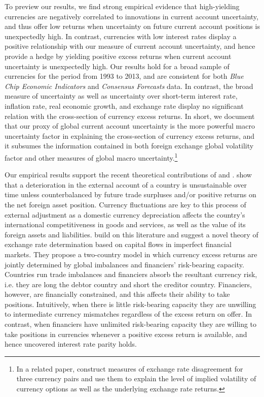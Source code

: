 To preview our results, we find strong empirical evidence that high-yielding currencies are negatively correlated to innovations in current account uncertainty, and thus offer low returns when uncertainty on future current account positions is unexpectedly high. In contrast, currencies with low interest rates display a positive relationship with our measure of current account uncertainty, and hence provide a hedge by yielding positive excess returns when current account uncertainty is unexpectedly high. Our results hold for a broad sample of currencies for the period from 1993 to 2013, and are consistent for both \emph{Blue Chip Economic Indicators} and \emph{Consensus Forecasts} data. In contrast, the broad measure of uncertainty as well as uncertainty over short-term interest rate, inflation rate, real economic growth, and exchange rate display no significant relation with the cross-section of currency excess returns. In short, we document that our proxy of global current account uncertainty is the more powerful macro uncertainty factor in explaining the cross-section of currency excess returns, and it subsumes the information contained in both foreign exchange global volatility factor and other measures of global macro uncertainty.\footnote{In a related paper, \citet{beber_etal2010} construct measures of exchange rate disagreement for three currency pairs and use them to explain the level of implied volatility of currency options as well as the underlying exchange rate returns.}

Our empirical results support the recent theoretical contributions of \citet{gourinchas_rey2007} and \citet{gabaix_maggiori2015}. \citet{gourinchas_rey2007} show that a deterioration in the external account of a country is unsustainable over time unless counterbalanced by future trade surpluses and/or positive returns on the net foreign asset position.  Currency fluctuations are key to this process of external adjustment as a domestic currency depreciation affects the country's international competitiveness in goods and services, as well as the value of its foreign assets and liabilities. \citet{gabaix_maggiori2015} build on this literature and suggest a novel theory of exchange rate determination based on capital flows in imperfect financial markets. They propose a two-country model in which currency excess returns are jointly determined by global imbalances and financiers' risk-bearing capacity. Countries run trade imbalances and financiers absorb the resultant currency risk, i.e. they are long the debtor country and short the creditor country. Financiers, however, are financially constrained, and this affects their ability to take positions. Intuitively, when there is little risk-bearing capacity they are unwilling to intermediate currency mismatches regardless of the excess return on offer. In contrast, when financiers have unlimited risk-bearing capacity they are willing to take positions in currencies whenever a positive excess return is available, and hence uncovered interest rate parity holds.


